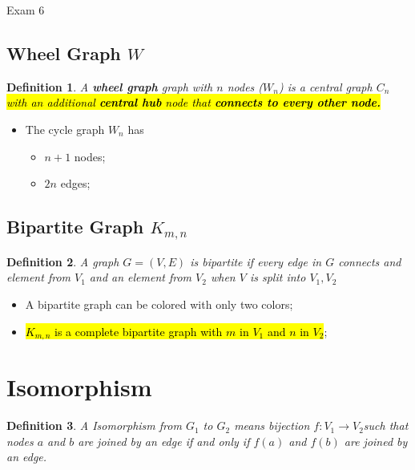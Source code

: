 \documentclass{note}
\newtheorem{definition}{Definition}
\begin{document}
\begin{note}{Exam 6}
        \subsection{Wheel Graph $ W $}

        \begin{definition}
            A \textbf{wheel graph} graph with $ n $ nodes ($ W_{n} $) is a central graph $ C_{n} $ \hl{with an additional
            \textbf{central hub} node that \textbf{connects to every other node.}}
        \end{definition}

        \begin{itemize}
            \item The cycle graph $ W_{n} $ has
            \begin{itemize}
                \item $ n + 1 $ nodes;
                \item $ 2n $ edges;
            \end{itemize}
        \end{itemize}

        \subsection{Bipartite Graph $ K_{m,n} $}

        \begin{definition}
            A graph $ G = \left(V, E\right) $ is bipartite if every edge in $ G $ connects and element from $ V_{1} $ and
            an element from $ V_{2} $ when $ V $ is split into $ V_{1},V_{2} $
        \end{definition}

        \begin{itemize}
            \item A bipartite graph can be colored with only two colors;
            \item \hl{$ K_{m,n} $ is a complete bipartite graph with $ m $ in $ V_{1} $ and $ n $ in $ V_{2} $};
        \end{itemize}


        \section{Isomorphism}

        \begin{definition}
            A Isomorphism from $ G_{1} $ to $ G_{2} $ means bijection $ f : V_1 \to V_2 $such that nodes $ a $ and $ b $ are joined
            by an edge if and only if  $ f(a) $ and $ f(b) $ are joined by an edge.
        \end{definition}


\end{note}
\end{document}
